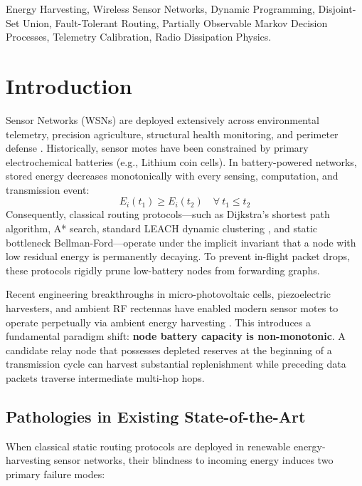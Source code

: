 \documentclass[journal]{IEEEtran}
\begin{document}
\begin{IEEEkeywords}
Energy Harvesting, Wireless Sensor Networks, Dynamic Programming, Disjoint-Set Union, Fault-Tolerant Routing, Partially Observable Markov Decision Processes, Telemetry Calibration, Radio Dissipation Physics.
\end{IEEEkeywords}

\section{Introduction}

 Sensor Networks (WSNs) are deployed extensively across environmental telemetry, precision agriculture, structural health monitoring, and perimeter defense \cite{akyildiz2002survey, sah2020renewable}. Historically, sensor motes have been constrained by primary electrochemical batteries (e.g., Lithium coin cells). In battery-powered networks, stored energy decreases monotonically with every sensing, computation, and transmission event:
\begin{equation}
E_i(t_1) \ge E_i(t_2) \quad \forall\ t_1 \le t_2
\end{equation}
Consequently, classical routing protocols---such as Dijkstra's shortest path algorithm, A* search, standard LEACH dynamic clustering \cite{heinzelman2002application}, and static bottleneck Bellman-Ford---operate under the implicit invariant that a node with low residual energy is permanently decaying. To prevent in-flight packet drops, these protocols rigidly prune low-battery nodes from forwarding graphs.

Recent engineering breakthroughs in micro-photovoltaic cells, piezoelectric harvesters, and ambient RF rectennas have enabled modern sensor motes to operate perpetually via ambient energy harvesting \cite{sudevalayam2011energy, sharma2020energy}. This introduces a fundamental paradigm shift: \textbf{node battery capacity is non-monotonic}. A candidate relay node that possesses depleted reserves at the beginning of a transmission cycle can harvest substantial replenishment while preceding data packets traverse intermediate multi-hop hops.

\subsection{Pathologies in Existing State-of-the-Art}
When classical static routing protocols are deployed in renewable energy-harvesting sensor networks, their blindness to incoming energy induces two primary failure modes:
\end{document}
